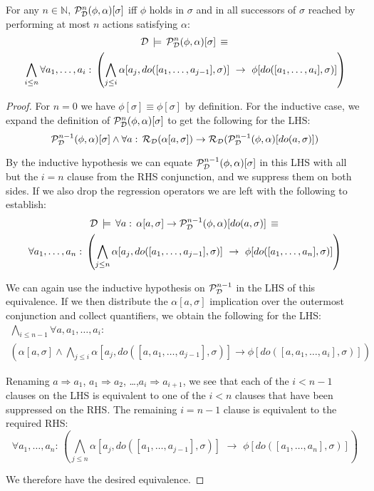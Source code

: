 \begin{thm}
For any $n\in\mathbb{N}$, $\mathcal{P}_{\mathcal{D}}^{n}(\phi,\alpha)[\sigma]$
iff $\phi$ holds in $\sigma$ and in all successors of $\sigma$
reached by performing at most $n$ actions satisfying $\alpha$:\begin{multline*}
\mathcal{D}\,\models\,\mathcal{P}_{\mathcal{D}}^{n}(\phi,\alpha)[\sigma]\,\equiv\,\\
\bigwedge_{i\leq n}\forall a_{1},\dots,a_{i}:\,\left(\bigwedge_{j\leq i}\alpha[a_{j},do([a_{1},\dots,a_{j-1}],\sigma)]\,\,\rightarrow\,\,\phi[do([a_{1},\dots,a_{i}],\sigma)]\right)\end{multline*}

\end{thm}
\begin{proof}
For $n=0$ we have $\phi[\sigma]\equiv\phi[\sigma]$ by definition.
For the inductive case, we expand the definition of $\mathcal{P}_{\mathcal{D}}^{n}(\phi,\alpha)[\sigma]$
to get the following for the LHS:\[
\mathcal{P}_{\mathcal{D}}^{n-1}(\phi,\alpha)[\sigma]\wedge\forall a:\,\mathcal{R}_{\mathcal{D}}(\alpha[a,\sigma])\rightarrow\mathcal{R}_{\mathcal{D}}(\mathcal{P}_{\mathcal{D}}^{n-1}(\phi,\alpha)[do(a,\sigma)])\]


By the inductive hypothesis we can equate $\mathcal{P}_{\mathcal{D}}^{n-1}(\phi,\alpha)[\sigma]$
in this LHS with all but the $i=n$ clause from the RHS conjunction,
and we suppress them on both sides. If we also drop the regression
operators we are left with the following to establish:\begin{multline*}
\mathcal{D}\,\models\,\forall a:\,\alpha[a,\sigma]\rightarrow\mathcal{P}_{\mathcal{D}}^{n-1}(\phi,\alpha)[do(a,\sigma)]\,\equiv\,\\
\forall a_{1},\dots,a_{n}:\,\left(\bigwedge_{j\leq n}\alpha[a_{j},do([a_{1},\dots,a_{j-1}],\sigma)]\,\,\rightarrow\,\,\phi[do([a_{1},\dots,a_{n}],\sigma)]\right)\end{multline*}


We can again use the inductive hypothesis on $\mathcal{P}_{\mathcal{D}}^{n-1}$ in
the LHS of this equivalence. If we then distribute the $\alpha[a,\sigma]$
implication over the outermost conjunction and collect quantifiers,
we obtain the following for the LHS:\begin{multline*}
\bigwedge_{i\leq n-1}\forall a,a_{1},\dots,a_{i}:\\
\left(\alpha[a,\sigma]\wedge\bigwedge_{j\leq i}\alpha[a_{j},do([a,a_{1},\dots,a_{j-1}],\sigma)]\rightarrow\phi[do([a,a_{1},\dots,a_{i}],\sigma)]\right)\end{multline*}


Renaming $a\Rightarrow a_{1}$, $a_{1}\Rightarrow a_{2}$, \ldots{},$a_{i}\Rightarrow a_{i+1}$,
we see that each of the $i<n-1$ clauses on the LHS is equivalent
to one of the $i<n$ clauses that have been suppressed on the RHS.
The remaining $i=n-1$ clause is equivalent to the required RHS: \[
\forall a_{1},\dots,a_{n}:\,\left(\bigwedge_{j\leq n}\alpha[a_{j},do([a_{1},\dots,a_{j-1}],\sigma)]\,\,\rightarrow\,\,\phi[do([a_{1},\dots,a_{n}],\sigma)]\right)\]


We therefore have the desired equivalence. 
\end{proof}
